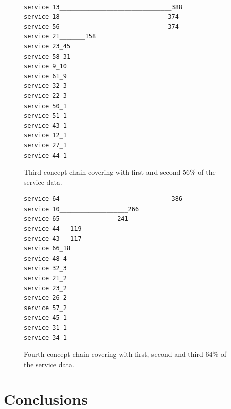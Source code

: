 \documentclass[acmconf,authordraft]{acmart}
\begin{document}
\begin{figure}[!htb]
\vspace{.5cm}
\begin{verbatim}

service 13_______________________________388
service 18______________________________374
service 56______________________________374
service 21_______158
service 23_45
service 58_31
service 9_10
service 61_9
service 32_3
service 22_3
service 50_1
service 51_1
service 43_1
service 12_1
service 27_1
service 44_1
\end{verbatim}

\caption{Third concept chain covering with first and second 56\% of the service data.}
\label{fig:ccc_3}
\end{figure}


\begin{figure}[!htb]
\vspace{.5cm}
\begin{verbatim}
service 64_______________________________386
service 10___________________266
service 65________________241
service 44___119
service 43___117
service 66_18
service 48_4
service 32_3
service 21_2
service 23_2
service 26_2
service 57_2
service 45_1
service 31_1
service 34_1
\end{verbatim}

\caption{Fourth concept chain covering with first, second and third 64\% of the service data.}
\label{fig:ccc_4}
\end{figure}

\section{Conclusions}





\end{document}

